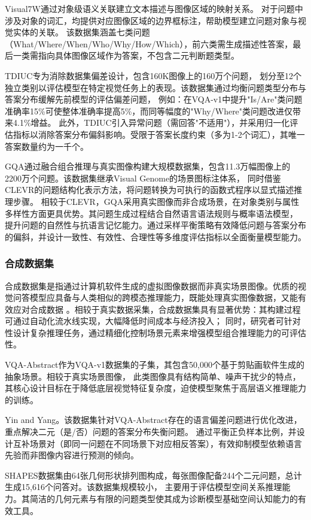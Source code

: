 Visual7W\cite{zhu2016visual7w}通过对象级语义关联建立文本描述与图像区域的映射关系。
对于问题中涉及对象的词汇，均提供对应图像区域的边界框标注，帮助模型建立问题对象与视觉实体的关联。
该数据集涵盖七类问题（What/Where/When/Who/Why/How/Which），前六类需生成描述性答案，最后一类需指向具体图像区域作为答案，不包含二元判断题类型。

TDIUC\cite{kafle2017analysis}专为消除数据集偏差设计，包含160K图像上的160万个问题，
划分至12个独立类别以评估模型在特定视觉任务上的表现。该数据集通过均衡问题类型分布与答案分布缓解先前模型的评估偏差问题，
例如：在VQA-v1中提升"Is/Are"类问题准确率15\%可使整体准确率提高5\%，而同等幅度的"Why/Where"类问题改进仅带来4.1\%增益。
此外，TDIUC引入异常问题（需回答"不适用"），并采用归一化评估指标以消除答案分布偏斜影响。受限于答案长度约束（多为1-2个词汇），其唯一答案数量约为一千个。

GQA\cite{hudson2019gqa}通过融合组合推理与真实图像构建大规模数据集，包含11.3万幅图像上的2200万个问题。该数据集继承Visual Genome的场景图标注体系，
同时借鉴CLEVR\cite{johnson2017clevr}的问题结构化表示方法，将问题转换为可执行的函数式程序以显式描述推理步骤。
相较于CLEVR，GQA采用真实图像而非合成场景，在对象类别与属性多样性方面更具优势。其问题生成过程结合自然语言语法规则与概率语法模型，
提升问题的自然性与抗语言记忆能力。通过采样平衡策略有效降低问题与答案分布的偏斜，并设计一致性、有效性、合理性等多维度评估指标以全面衡量模型能力。
\subsubsection{合成数据集}
合成数据集是指通过计算机软件生成的虚拟图像数据而非真实场景图像。优质的视觉问答模型应具备与人类相似的跨模态推理能力，既能处理真实图像数据，又能有效应对合成数据
。相较于真实数据采集，合成数据集具有显著优势：其构建过程可通过自动化流水线实现，大幅降低时间成本与经济投入；
同时，研究者可针对性设计复杂推理任务，通过精细化控制场景元素来增强模型组合推理能力的可评估性。

VQA-Abstract作为VQA-v1数据集的子集，其包含50,000个基于剪贴画软件生成的抽象场景。相较于真实场景图像，
此类图像具有结构简单、噪声干扰少的特点，其核心设计目标在于降低底层视觉特征复杂度，迫使模型聚焦于高层语义推理能力的训练。

Yin and Yang\cite{zhang2016yin}。该数据集针对VQA-Abstract存在的语言偏差问题进行优化改进，重点解决二元（是/否）问题的答案分布失衡问题。
通过平衡正负样本比例，并设计互补场景对（即同一问题在不同场景下对应相反答案），有效抑制模型依赖语言先验而非图像内容进行预测的倾向。

SHAPES\cite{andreas2016neural}数据集由64张几何形状排列图构成，每张图像配备244个二元问题，总计生成15,616个问答对。该数据集规模较小，
主要用于评估模型空间关系推理能力。其简洁的几何元素与有限的问题类型使其成为诊断模型基础空间认知能力的有效工具。

